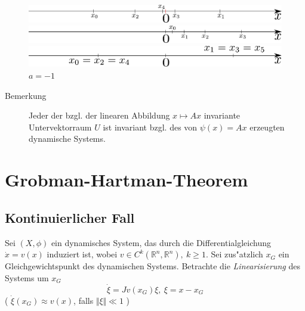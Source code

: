 \documentclass[a4paper, 13pt]{scrreprt}
\theoremstyle{definition} \newtheorem{definition}{Definition}[section]
\newcommand{\RR}{\mathbb{R}}
\begin{document}
\begin{figure}[htpb]
		\centering
		\includegraphics[width=1\textwidth]{img/lin_sys/diskret/lin_sys_1.pdf}
		\caption{$|a| < 1, \ a < 0$}

		\includegraphics[width=1\textwidth]{img/lin_sys/diskret/lin_sys_2.pdf}
		\caption{$|a| > 1, \ a > 1$}

		\includegraphics[width=1\textwidth]{img/lin_sys/diskret/lin_sys_3.pdf}
		\caption{$a = -1$}
\end{figure}

\begin{description}
\item[Bemerkung]
	Jeder der bzgl. der linearen Abbildung \(x\mapsto Ax \) invariante Untervektorraum \(U\) ist invariant bzgl. des von \(\psi(x) = Ax \) erzeugten dynamische Systems.
\end{description}


\chapter{Grobman-Hartman-Theorem}

\section{Kontinuierlicher Fall}
Sei $(X,\phi)$ ein dynamisches System, das durch die Differentialgleichung ${\dot x = v(x)}$ induziert ist, wobei $v \in C^k(\RR^n, \RR^n), \ k \geq 1$. Sei zus"atzlich  $x_G$ ein Gleichgewichtspunkt des dynamischen Systems. Betrachte die \emph{Linearisierung} des Systems um $x_G$ 
\[\dot{\xi}=Jv(x_G)\xi, \ \xi =x-x_G\] 
( $\dot{\xi}(x_G)\approx v(x)$, falls $\Vert\xi\Vert\ll 1$ )
\end{document}
